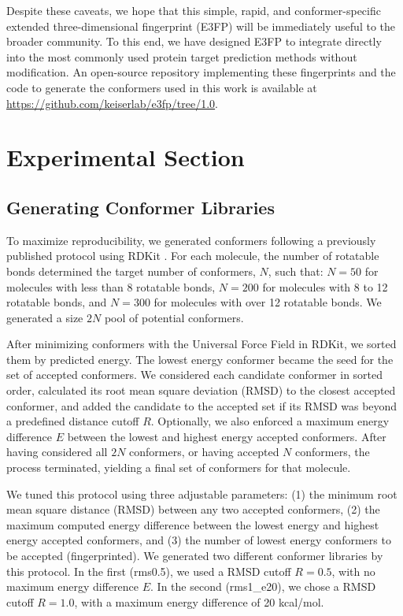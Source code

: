 \documentclass[../../main.tex]{subfiles}
\begin{document}
\begin{refsection}
	Despite these caveats, we hope that this simple, rapid, and conformer-specific extended three-dimensional fingerprint (E3FP) will be immediately useful to the broader community.
	To this end, we have designed E3FP to integrate directly into the most commonly used protein target prediction methods without modification.
	An open-source repository implementing these fingerprints and the code to generate the conformers used in this work is available at \url{https://github.com/keiserlab/e3fp/tree/1.0}.

	\section{Experimental Section}\label{sec:expsec}

	\subsection*{Generating Conformer Libraries}

	To maximize reproducibility, we generated conformers following a previously published protocol \supercite{ebejer_2012} using RDKit  \supercite{rdkit}.
	For each molecule, the number of rotatable bonds determined the target number of conformers, $N$, such that: $N=50$ for molecules with less than 8 rotatable bonds, $N=200$ for molecules with 8 to 12 rotatable bonds, and $N=300$ for molecules with over 12 rotatable bonds.
	We generated a size $2N$ pool of potential conformers.

	After minimizing conformers with the Universal Force Field  \supercite{rappe_1992} in RDKit, we sorted them by predicted energy.
	The lowest energy conformer became the seed for the set of accepted conformers.
	We considered each candidate conformer in sorted order, calculated its root mean square deviation (RMSD) to the closest accepted conformer, and added the candidate to the accepted set if its RMSD was beyond a predefined distance cutoff $R$.
	Optionally, we also enforced a maximum energy difference $E$ between the lowest and highest energy accepted conformers.
	After having considered all  $2N$ conformers, or having accepted $N$ conformers, the process terminated, yielding a final set of conformers for that molecule.

	We tuned this protocol using three adjustable parameters: (1) the minimum root mean square distance (RMSD) between any two accepted conformers, (2) the maximum computed energy difference between the lowest energy and highest energy accepted conformers, and (3) the number of lowest energy conformers to be accepted (fingerprinted).
	We generated two different conformer libraries by this protocol.
	In the first  (rms0.5), we used a RMSD cutoff $R=0.5$, with no maximum energy difference $E$.
	In the second (rms1\_e20), we chose a RMSD cutoff  $R=1.0$, with a maximum energy difference of 20 kcal/mol.


\end{refsection}
\end{document}
